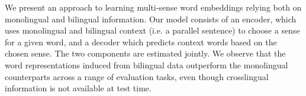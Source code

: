 We present an approach to learning multi-sense word embeddings relying both on monolingual and bilingual information. Our model consists of an encoder, which uses monolingual and bilingual context (i.e. a parallel sentence) to choose a sense for a given word, and a decoder which predicts context words based on the chosen sense. The two components are estimated jointly. We observe that the word representations induced from bilingual data outperform the monolingual counterparts across a range of evaluation tasks, even though crosslingual information is not available at test time.
